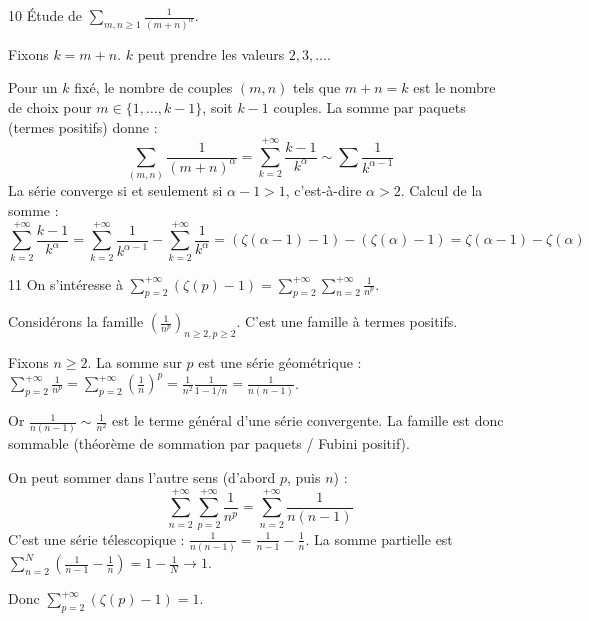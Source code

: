 \begin{correction}{10}
    Étude de $\sum_{m,n \ge 1} \frac{1}{(m+n)^\alpha}$.

    Fixons $k = m+n$. $k$ peut prendre les valeurs $2, 3, \dots$.

    Pour un $k$ fixé, le nombre de couples $(m,n)$ tels que $m+n=k$ est le nombre de choix pour $m \in \{1, \dots, k-1\}$, soit $k-1$ couples.
    La somme par paquets (termes positifs) donne :
    $$ \sum_{(m,n)} \frac{1}{(m+n)^\alpha} = \sum_{k=2}^{+\infty} \frac{k-1}{k^\alpha} \sim \sum \frac{1}{k^{\alpha-1}} $$
    La série converge si et seulement si $\alpha-1 > 1$, c'est-à-dire $\alpha > 2$.
    Calcul de la somme :
    $$ \sum_{k=2}^{+\infty} \frac{k-1}{k^\alpha} = \sum_{k=2}^{+\infty} \frac{1}{k^{\alpha-1}} - \sum_{k=2}^{+\infty} \frac{1}{k^\alpha} = (\zeta(\alpha-1)-1) - (\zeta(\alpha)-1) = \zeta(\alpha-1) - \zeta(\alpha) $$
\end{correction}

\begin{correction}{11}
    On s'intéresse à $\displaystyle \sum_{p=2}^{+\infty} (\zeta(p)-1) = \sum_{p=2}^{+\infty} \sum_{n=2}^{+\infty} \frac{1}{n^p}$.

    Considérons la famille $(\frac{1}{n^p})_{n\geqslant2, p\geqslant2}$.
    C'est une famille à termes positifs.

    Fixons $n \geqslant 2$. La somme sur $p$ est une série géométrique :
    $\displaystyle \sum_{p=2}^{+\infty} \frac{1}{n^p} = \sum_{p=2}^{+\infty} \left(\frac{1}{n}\right)^p = \frac{1}{n^2} \frac{1}{1-1/n} = \frac{1}{n(n-1)}$.

    Or $\frac{1}{n(n-1)} \sim \frac{1}{n^2}$ est le terme général d'une série convergente.
    La famille est donc sommable (théorème de sommation par paquets / Fubini positif).

    On peut sommer dans l'autre sens (d'abord $p$, puis $n$) :
    $$ \sum_{n=2}^{+\infty} \sum_{p=2}^{+\infty} \frac{1}{n^p} = \sum_{n=2}^{+\infty} \frac{1}{n(n-1)} $$
    C'est une série télescopique : $\frac{1}{n(n-1)} = \frac{1}{n-1} - \frac{1}{n}$.
    La somme partielle est $\sum_{n=2}^N \left(\frac{1}{n-1} - \frac{1}{n}\right) = 1 - \frac{1}{N} \to 1$.

    Donc $\displaystyle \sum_{p=2}^{+\infty} (\zeta(p)-1) = 1$.
\end{correction}

